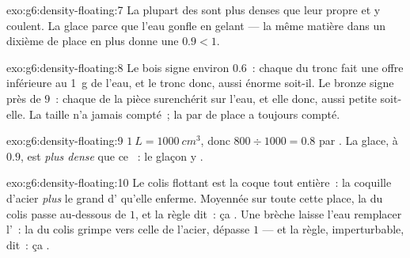 \begin{solution}{exo:g6:density-floating:7}
La plupart des  sont plus denses que leur propre  et y
coulent. La glace  parce que l'eau gonfle en gelant --- la même
matière dans un dixième de place en plus donne une 
$0.9 < 1$.
\end{solution}

\begin{solution}{exo:g6:density-floating:8}
Le bois signe environ $0.6$~: chaque  du tronc fait
une offre inférieure au \qty{1}{g} de l'eau, et le tronc  donc,
aussi énorme soit-il. Le bronze signe près de $9$~: chaque  de la pièce surenchérit sur l'eau, et elle  donc, aussi
petite soit-elle. La taille n'a jamais compté~; la  par  de
place a toujours compté.
\end{solution}

\begin{solution}{exo:g6:density-floating:9}
$\qty{1}{L} = \qty{1000}{cm^3}$, donc $800 \div 1000 = 0.8$ 
par . La glace, à $0.9$, est \emph{plus dense} que ce
~: le glaçon y .
\end{solution}

\begin{solution}{exo:g6:density-floating:10}
Le colis flottant est la coque tout entière~: la coquille d'acier
\emph{plus} le grand  d' qu'elle enferme. Moyennée sur toute
cette place, la  du colis passe au-dessous de $1$, et
la règle dit~: ça . Une brèche laisse l'eau remplacer l'~: la
 du colis grimpe vers celle de l'acier, dépasse $1$
--- et la règle, imperturbable, dit~: ça .
\end{solution}

